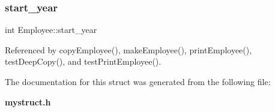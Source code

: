 \subsubsection{start\+\_\+year}
{\footnotesize\ttfamily int Employee\+::start\+\_\+year}



Referenced by copy\+Employee(), make\+Employee(), print\+Employee(), test\+Deep\+Copy(), and test\+Print\+Employee().



The documentation for this struct was generated from the following file\+:\begin{DoxyCompactItemize}
\item 
\textbf{ mystruct.\+h}\end{DoxyCompactItemize}
